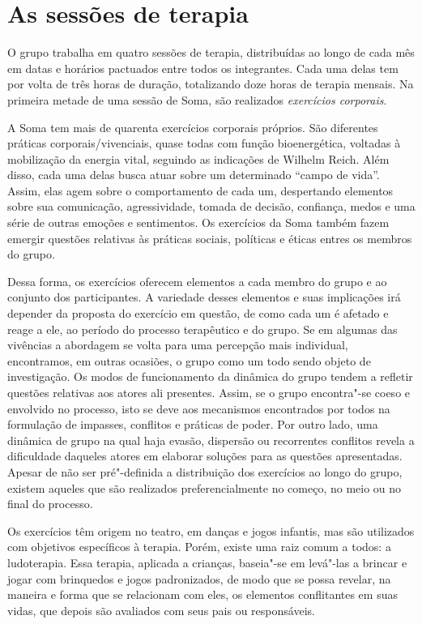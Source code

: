 \section{As sessões de terapia}

O grupo trabalha em quatro sessões de terapia, distribuídas ao longo de
cada mês em datas e horários pactuados entre todos os integrantes. Cada
uma delas tem por volta de três horas de duração, totalizando doze horas
de terapia mensais. Na primeira metade de uma sessão de Soma, são
realizados \emph{exercícios corporais}.

A Soma tem mais de quarenta exercícios corporais próprios. São
diferentes práticas corporais/vivenciais, quase todas com função
bioenergética, voltadas à mobilização da energia vital, seguindo as
indicações de Wilhelm Reich. Além disso, cada uma delas busca atuar
sobre um determinado ``campo de vida''. Assim, elas agem sobre o
comportamento de cada um, despertando elementos sobre sua comunicação,
agressividade, tomada de decisão, confiança, medos e uma série de outras
emoções e sentimentos. Os exercícios da Soma também fazem emergir
questões relativas às práticas sociais, políticas e éticas entres os
membros do grupo.

Dessa forma, os exercícios oferecem elementos a cada membro do grupo e
ao conjunto dos participantes. A variedade desses elementos e suas
implicações irá depender da proposta do exercício em questão, de como
cada um é afetado e reage a ele, ao período do processo terapêutico e do
grupo. Se em algumas das vivências a abordagem se volta para uma
percepção mais individual, encontramos, em outras ocasiões, o grupo como
um todo sendo objeto de investigação. Os modos de funcionamento da
dinâmica do grupo tendem a refletir questões relativas aos atores ali
presentes. Assim, se o grupo encontra"-se coeso e envolvido no processo,
isto se deve aos mecanismos encontrados por todos na formulação de
impasses, conflitos e práticas de poder. Por outro lado, uma dinâmica de
grupo na qual haja evasão, dispersão ou recorrentes conflitos revela a
dificuldade daqueles atores em elaborar soluções para as questões
apresentadas. Apesar de não ser pré"-definida a distribuição dos
exercícios ao longo do grupo, existem aqueles que são realizados
preferencialmente no começo, no meio ou no final do processo.

Os exercícios têm origem no teatro, em danças e jogos infantis, mas são
utilizados com objetivos específicos à terapia. Porém, existe uma raiz
comum a todos: a ludoterapia. Essa terapia, aplicada a crianças,
baseia"-se em levá"-las a brincar e jogar com brinquedos e jogos
padronizados, de modo que se possa revelar, na maneira e forma que se
relacionam com eles, os elementos conflitantes em suas vidas, que depois
são avaliados com seus pais ou responsáveis.

